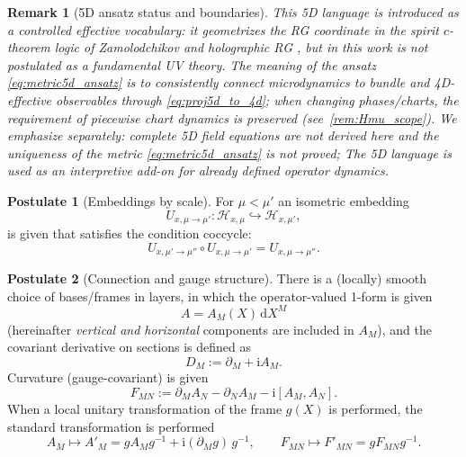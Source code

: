 \documentclass[11pt,a4paper]{article}
\newcommand{\ii}{\mathrm{i}}
\newcommand{\dd}{\mathrm{d}}
\theoremstyle{definition}
\newtheorem{axiom}{Postulate}[section]
\theoremstyle{plain}
\newtheorem{remark}{Remark}[section]
\theoremstyle{remark}
\begin{document}
\begin{remark}[5D ansatz status and boundaries]\label{rem:5dRG_status}
This 5D language is introduced as a \emph{controlled effective vocabulary}:
it geometrizes the RG coordinate in the spirit $c$-theorem logic of Zamolodchikov
\cite{Zamolodchikov1986Irreversibility} and holographic RG
\cite{deBoerVerlindeVerlinde2000HolographicRG},
but in this work is not postulated as a fundamental UV theory.
The meaning of the ansatz \eqref{eq:metric5d_ansatz} is to consistently connect
microdynamics to bundle and 4D-effective observables through
\eqref{eq:proj5d_to_4d}; when changing phases/charts, the requirement of piecewise
chart dynamics is preserved (see\ \cref{rem:Hmu_scope}).
We emphasize separately: complete 5D field equations are not derived here and the
uniqueness of the metric \eqref{eq:metric5d_ansatz} is not proved; The 5D language is used as an
interpretive add-on for already defined operator dynamics.
\end{remark}

\begin{axiom}[Embeddings by scale]\label{ax:embeddings}
For $\mu<\mu'$ an isometric embedding
\begin{equation}\label{eq:embedding}
U_{x,\mu\to\mu'}:\mathcal H_{x,\mu}\hookrightarrow \mathcal H_{x,\mu'},
\end{equation}
is given that satisfies the condition coccycle:
\begin{equation}\label{eq:cocycle}
U_{x,\mu'\to\mu''}\circ U_{x,\mu\to\mu'} = U_{x,\mu\to\mu''}.
\end{equation}
\end{axiom}

\begin{axiom}[Connection and gauge structure]\label{ax:connection}
There is a (locally) smooth choice of bases/frames in layers, in which the operator-valued 1-form is given
\[
A = A_M(X)\,\dd X^M
\]
(hereinafter \emph{vertical and horizontal} components are included in $A_M$),
and the covariant derivative on sections is defined as
\begin{equation}\label{eq:covder}
D_M := \partial_M + \ii A_M.
\end{equation}
Curvature (gauge-covariant) is given
\begin{equation}\label{eq:curvature}
F_{MN} := \partial_M A_N - \partial_N A_M - \ii[A_M,A_N].
\end{equation}
When a local unitary transformation of the frame $g(X)$ is performed, the standard transformation is performed
\begin{equation}\label{eq:gaugetransf}
A_M \mapsto A'_M = gA_M g^{-1} + \ii(\partial_M g)\,g^{-1},
\qquad
F_{MN}\mapsto F'_{MN}=gF_{MN}g^{-1}.
\end{equation}
\end{axiom}
\end{document}
